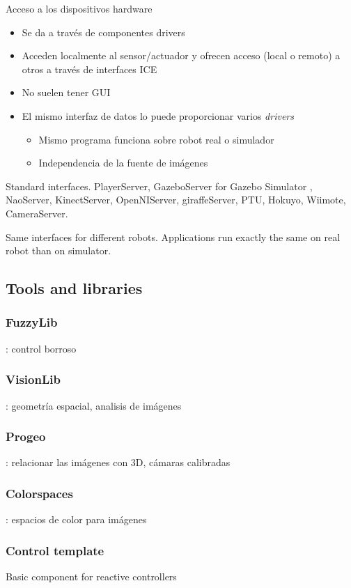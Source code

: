 \documentclass[twocolumn]{svjour3}          %
\begin{document}
Acceso a los dispositivos hardware
\begin{itemize}
\item Se da a través de {componentes drivers}
\item Acceden localmente al sensor/actuador y ofrecen acceso (local o remoto) a otros a través de interfaces ICE
\item No suelen tener GUI
\item El mismo interfaz de datos lo puede proporcionar varios \textit{drivers}
\begin{itemize}
\item Mismo programa funciona sobre robot real o simulador
\item Independencia de la fuente de imágenes
\end{itemize}
\end{itemize}


Standard interfaces. 
PlayerServer, GazeboServer for Gazebo Simulator \cite{koening2004}, NaoServer, KinectServer, OpenNIServer, giraffeServer, PTU, Hokuyo, Wiimote, CameraServer.

Same interfaces for different robots.
Applications run exactly the same on real robot than on simulator. 

\subsection{Tools and libraries}

\subsubsection{FuzzyLib}: control borroso
\subsubsection{VisionLib}: geometría espacial, analisis de imágenes 
\subsubsection{Progeo}: relacionar las imágenes con 3D, cámaras calibradas 
\subsubsection{Colorspaces}: espacios de color para imágenes

\subsubsection{Control template}
Basic component for reactive controllers
\end{document}
